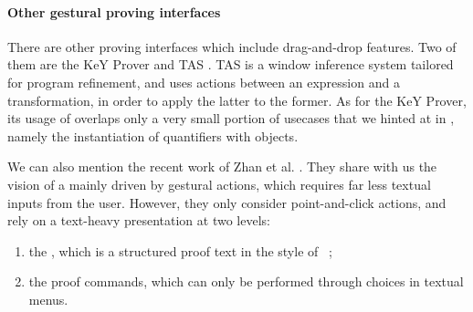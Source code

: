 

\paragraph{Other gestural proving interfaces}

There are other proving interfaces which include drag-and-drop features. Two of
them are the KeY Prover  and TAS
. TAS is a window inference system tailored for program
refinement, and uses  actions between an expression and a transformation, in
order to apply the latter to the former.
As for the KeY Prover, its usage of  overlaps only a very small
portion of usecases that we hinted at in , namely
the instantiation of quantifiers with objects.

We can also mention the recent work of Zhan et al. .
They share with us the vision of a  mainly driven by gestural
actions, which requires far less textual inputs from the user. However, they
only consider point-and-click actions, and rely on a text-heavy presentation at
two levels:
\begin{enumerate}
  \item the , which is a structured proof text in the style of
  ~;
  \item the proof commands, which can only be performed through choices in
  textual menus.
\end{enumerate}

